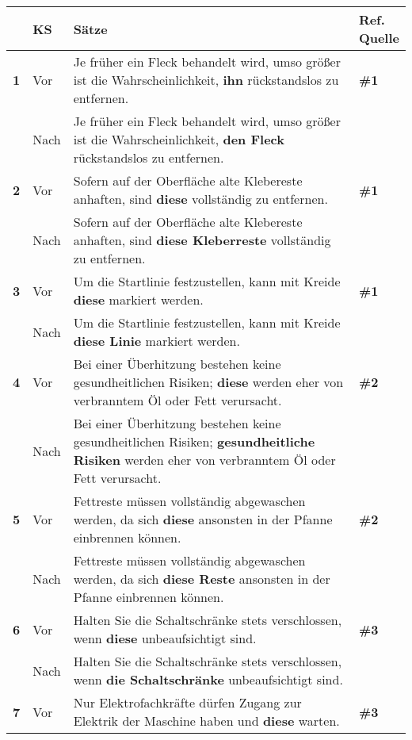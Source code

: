 \begin{longtable}{llp{}l}

\lsptoprule
{} & \textbf{KS} & \textbf{Sätze} & \makecell[tl]{\textbf{Ref.}\\\textbf{Quelle}}\\
\midrule
{ \textbf{1}} & Vor & Je früher ein Fleck behandelt wird, umso größer ist die Wahrscheinlichkeit, \textbf{ihn} rückstandslos zu entfernen. & \textbf{\#1}\\
& Nach & Je früher ein Fleck behandelt wird, umso größer ist die Wahrscheinlichkeit, \textbf{den Fleck} rückstandslos zu entfernen. & \\
\tablevspace
{ \textbf{2}} & Vor & Sofern auf der Oberfläche alte Klebereste anhaften, sind \textbf{diese} vollständig zu entfernen. & \textbf{\#1}\\
& Nach & Sofern auf der Oberfläche alte Klebereste anhaften, sind \textbf{diese Kleberreste} vollständig zu entfernen. & \\
\tablevspace
{ \textbf{3}} & Vor & Um die Startlinie festzustellen, kann mit Kreide \textbf{diese} markiert werden. & \textbf{\#1}\\
& Nach & Um die Startlinie festzustellen, kann mit Kreide \textbf{diese Linie} markiert werden. & \\
\tablevspace
{ \textbf{4}} & Vor & Bei einer Überhitzung bestehen keine gesundheitlichen Risiken; \textbf{diese} werden eher von verbranntem Öl oder Fett verursacht. & \textbf{\#2}\\
& Nach & Bei einer Überhitzung bestehen keine gesundheitlichen Risiken; \textbf{gesundheitliche Risiken} werden eher von verbranntem Öl oder Fett verursacht. & \\
\tablevspace
{ \textbf{5}} & Vor & Fettreste müssen vollständig abgewaschen werden, da sich \textbf{diese} ansonsten in der Pfanne einbrennen können. & \textbf{\#2}\\
& Nach & Fettreste müssen vollständig abgewaschen werden, da sich \textbf{diese Reste} ansonsten in der Pfanne einbrennen können. & \\
\tablevspace
{ \textbf{6}} & Vor & Halten Sie die Schaltschränke stets verschlossen, wenn \textbf{diese} unbeaufsichtigt sind. & \textbf{\#3}\\
& Nach & Halten Sie die Schaltschränke stets verschlossen, wenn \textbf{die Schaltschränke} unbeaufsichtigt sind. & \\
\tablevspace
{ \textbf{7}} & Vor & Nur Elektrofachkräfte dürfen Zugang zur Elektrik der Maschine haben und \textbf{diese} warten. & \textbf{\#3}\\

\end{longtable}
